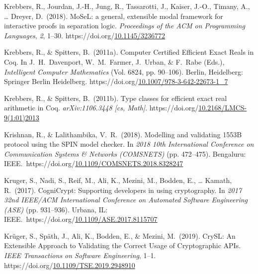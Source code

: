 \documentclass[12pt,twoside]{article}
\begin{document}
{\begin{thebibliography}{1079}
\mdbibitemlabel{}Krebbers, R., Jourdan, J.-H., Jung, R., Tassarotti, J., Kaiser, J.-O., Timany, A., … Dreyer, D.~(2018). MoSeL: a general, extensible modal framework for interactive proofs in separation logic. \emph{Proceedings of the ACM on Programming Languages}, \emph{2}, 1–30. https://doi.org/\href{https://dx.doi.org/10.1145/3236772}{10.1145/3236772}%

\mdbibitemlabel{}Krebbers, R., \& Spitters, B.~(2011a). Computer Certified Efficient Exact Reals in Coq. In J.~H.~Davenport, W.~M.~Farmer, J.~Urban, \& F.~Rabe (Eds.), \emph{Intelligent Computer Mathematics} (Vol. 6824, pp. 90–106). Berlin, Heidelberg: Springer Berlin Heidelberg. https://doi.org/\href{https://dx.doi.org/10.1007/978-3-642-22673-1_7}{10.1007/978-3-642-22673-1\_7}%

\mdbibitemlabel{}Krebbers, R., \& Spitters, B.~(2011b). Type classes for efficient exact real arithmetic in Coq. \emph{arXiv:1106.3448 {}[cs, Math]}. https://doi.org/\href{https://dx.doi.org/10.2168/LMCS-9\%25281:01\%25292013}{10.2168/LMCS-9(1:01)2013}%

\mdbibitemlabel{}Krishnan, R., \& Lalithambika, V.~R.~(2018). Modelling and validating 1553B protocol using the SPIN model checker. In \emph{2018 10th International Conference on Communication Systems \& Networks (COMSNETS)} (pp. 472–475). Bengaluru: IEEE.~https://doi.org/\href{https://dx.doi.org/10.1109/COMSNETS.2018.8328247}{10.1109/COMSNETS.2018.8328247}%

\mdbibitemlabel{}Kruger, S., Nadi, S., Reif, M., Ali, K., Mezini, M., Bodden, E., … Kamath, R.~(2017). CogniCrypt: Supporting developers in using cryptography. In \emph{2017 32nd IEEE/ACM International Conference on Automated Software Engineering (ASE)} (pp. 931–936). Urbana, IL: IEEE.~https://doi.org/\href{https://dx.doi.org/10.1109/ASE.2017.8115707}{10.1109/ASE.2017.8115707}%

\mdbibitemlabel{}Krüger, S., Späth, J., Ali, K., Bodden, E., \& Mezini, M.~(2019). CrySL: An Extensible Approach to Validating the Correct Usage of Cryptographic APIs. \emph{IEEE Transactions on Software Engineering}, 1–1. https://doi.org/\href{https://dx.doi.org/10.1109/TSE.2019.2948910}{10.1109/TSE.2019.2948910}%


\end{thebibliography}}
\end{document}

